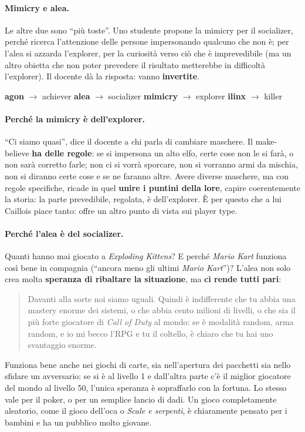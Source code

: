 \paragraph{Mimicry e alea.} Le altre due sono ``più toste''. Uno studente propone la
mimicry per il socializer, perché ricerca l'attenzione delle persone impersonando
qualcuno che non è; per l'alea si azzarda l'explorer, per la curiosità verso ciò che
è imprevedibile (ma un altro obietta che non poter prevedere il risultato metterebbe
in difficoltà l'explorer). Il docente dà la risposta: vanno \textbf{invertite}.
\begin{center}
\textbf{agon} $\rightarrow$ achiever \qquad \textbf{alea} $\rightarrow$ socializer
\qquad \textbf{mimicry} $\rightarrow$ explorer \qquad \textbf{ilinx} $\rightarrow$
killer
\end{center}

\paragraph{Perché la mimicry è dell'explorer.} ``Ci siamo quasi'', dice il docente a
chi parla di cambiare maschere. Il make-believe \textbf{ha delle regole}: se si
impersona un alto elfo, certe cose non le si farà, o non sarà corretto farle; non ci
si vorrà sporcare, non si vorranno armi da mischia, non si diranno certe cose e se
ne faranno altre. Avere diverse maschere, ma con regole specifiche, ricade in quel
\textbf{unire i puntini della lore}, capire coerentemente la storia: la parte
prevedibile, regolata, è dell'explorer. È per questo che a lui Caillois piace tanto:
offre un altro punto di vista sui player type.

\paragraph{Perché l'alea è del socializer.} Quanti hanno mai giocato a
\emph{Exploding Kittens}? E perché \emph{Mario Kart} funziona così bene in compagnia
(``ancora meno gli ultimi \emph{Mario Kart}'')? L'alea non solo crea molta
\textbf{speranza di ribaltare la situazione}, ma \textbf{ci rende tutti pari}:
\begin{quote}
Davanti alla sorte noi siamo uguali. Quindi è indifferente che tu abbia una mastery
enorme dei sistemi, o che abbia cento milioni di livelli, o che sia il più forte
giocatore di \emph{Call of Duty} al mondo: se è modalità random, arma random, e io mi
becco l'RPG e tu il coltello, è chiaro che tu hai uno svantaggio enorme.
\end{quote}
Funziona bene anche nei giochi di carte, sia nell'apertura dei pacchetti sia nello
sfidare un avversario: se si è al livello 1 e dall'altra parte c'è il miglior
giocatore del mondo al livello 50, l'unica speranza è sopraffarlo con la fortuna. Lo
stesso vale per il poker, o per un semplice lancio di dadi. Un gioco completamente
aleatorio, come il gioco dell'oca o \emph{Scale e serpenti}, è chiaramente pensato
per i bambini e ha un pubblico molto giovane.

